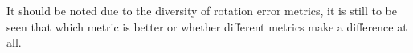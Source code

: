 \documentclass[twocolumn,10pt]{asme2ej}
\begin{document}
It should be noted due to the diversity of rotation error metrics, it is still to be seen that which metric is better or whether different metrics make a difference at all. 

\end{document}
